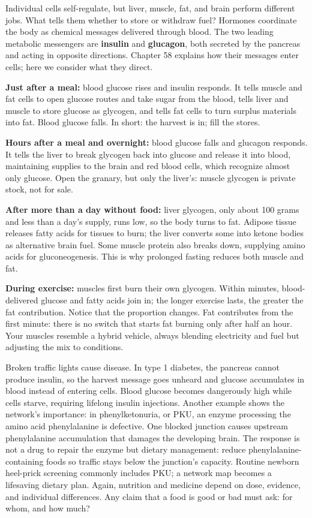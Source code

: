 Individual cells self-regulate, but liver, muscle, fat, and brain perform different jobs. What tells them whether to store or withdraw fuel? Hormones coordinate the body as chemical messages delivered through blood. The two leading metabolic messengers are \textbf{insulin} and \textbf{glucagon}, both secreted by the pancreas and acting in opposite directions. Chapter 58 explains how their messages enter cells; here we consider what they direct.

\textbf{Just after a meal:} blood glucose rises and insulin responds. It tells muscle and fat cells to open glucose routes and take sugar from the blood, tells liver and muscle to store glucose as glycogen, and tells fat cells to turn surplus materials into fat. Blood glucose falls. In short: the harvest is in; fill the stores.

\textbf{Hours after a meal and overnight:} blood glucose falls and glucagon responds. It tells the liver to break glycogen back into glucose and release it into blood, maintaining supplies to the brain and red blood cells, which recognize almost only glucose. Open the granary, but only the liver's: muscle glycogen is private stock, not for sale.

\textbf{After more than a day without food:} liver glycogen, only about 100 grams and less than a day's supply, runs low, so the body turns to fat. Adipose tissue releases fatty acids for tissues to burn; the liver converts some into ketone bodies as alternative brain fuel. Some muscle protein also breaks down, supplying amino acids for gluconeogenesis. This is why prolonged fasting reduces both muscle and fat.

\textbf{During exercise:} muscles first burn their own glycogen. Within minutes, blood-delivered glucose and fatty acids join in; the longer exercise lasts, the greater the fat contribution. Notice that the proportion changes. Fat contributes from the first minute: there is no switch that starts fat burning only after half an hour. Your muscles resemble a hybrid vehicle, always blending electricity and fuel but adjusting the mix to conditions.

Broken traffic lights cause disease. In type 1 diabetes, the pancreas cannot produce insulin, so the harvest message goes unheard and glucose accumulates in blood instead of entering cells. Blood glucose becomes dangerously high while cells starve, requiring lifelong insulin injections. Another example shows the network's importance: in phenylketonuria, or PKU, an enzyme processing the amino acid phenylalanine is defective. One blocked junction causes upstream phenylalanine accumulation that damages the developing brain. The response is not a drug to repair the enzyme but dietary management: reduce phenylalanine-containing foods so traffic stays below the junction's capacity. Routine newborn heel-prick screening commonly includes PKU; a network map becomes a lifesaving dietary plan. Again, nutrition and medicine depend on dose, evidence, and individual differences. Any claim that a food is good or bad must ask: for whom, and how much?

